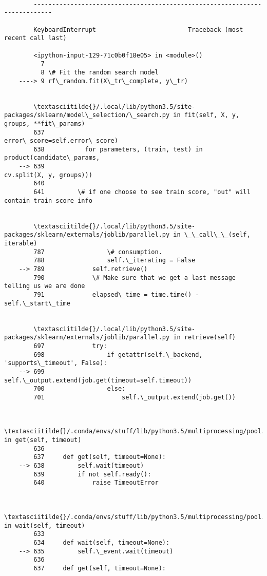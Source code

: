 \documentclass[11pt]{article}
\begin{document}
    \begin{Verbatim}[commandchars=\\\{\}]

        ---------------------------------------------------------------------------

        KeyboardInterrupt                         Traceback (most recent call last)

        <ipython-input-129-71c0b0f18e05> in <module>()
          7 
          8 \# Fit the random search model
    ----> 9 rf\_random.fit(X\_tr\_complete, y\_tr)
    

        \textasciitilde{}/.local/lib/python3.5/site-packages/sklearn/model\_selection/\_search.py in fit(self, X, y, groups, **fit\_params)
        637                                   error\_score=self.error\_score)
        638           for parameters, (train, test) in product(candidate\_params,
    --> 639                                                    cv.split(X, y, groups)))
        640 
        641         \# if one choose to see train score, "out" will contain train score info


        \textasciitilde{}/.local/lib/python3.5/site-packages/sklearn/externals/joblib/parallel.py in \_\_call\_\_(self, iterable)
        787                 \# consumption.
        788                 self.\_iterating = False
    --> 789             self.retrieve()
        790             \# Make sure that we get a last message telling us we are done
        791             elapsed\_time = time.time() - self.\_start\_time


        \textasciitilde{}/.local/lib/python3.5/site-packages/sklearn/externals/joblib/parallel.py in retrieve(self)
        697             try:
        698                 if getattr(self.\_backend, 'supports\_timeout', False):
    --> 699                     self.\_output.extend(job.get(timeout=self.timeout))
        700                 else:
        701                     self.\_output.extend(job.get())


        \textasciitilde{}/.conda/envs/stuff/lib/python3.5/multiprocessing/pool.py in get(self, timeout)
        636 
        637     def get(self, timeout=None):
    --> 638         self.wait(timeout)
        639         if not self.ready():
        640             raise TimeoutError


        \textasciitilde{}/.conda/envs/stuff/lib/python3.5/multiprocessing/pool.py in wait(self, timeout)
        633 
        634     def wait(self, timeout=None):
    --> 635         self.\_event.wait(timeout)
        636 
        637     def get(self, timeout=None):



\end{Verbatim}
\end{document}
